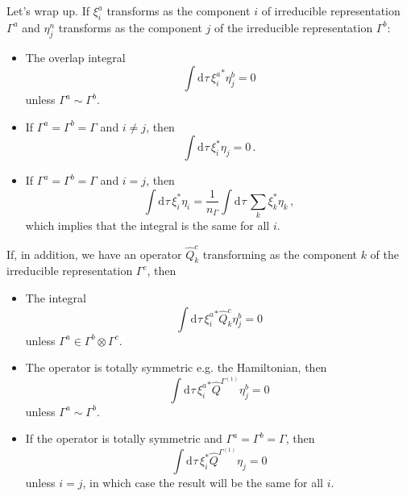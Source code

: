 \documentclass{article}
\theoremstyle{plain}\theoremheaderfont{\normalfont\itshape}\theorembodyfont{\rmfamily}\theoremseparator{.}\newtheorem*{rem}{Remark}\newtheorem*{ex}{Example}\newtheorem*{proof}{Proof}\newtheorem*{altp}{Alternative proof}
\theoremstyle{plain}\theoremheaderfont{\normalfont\bfseries}\theorembodyfont{\rmfamily}\theoremseparator{.}\newtheorem{thm}{Theorem}[section]\newtheorem{lem}[thm]{Lemma}\newtheorem{prop}[thm]{Proposition}\newtheorem*{cor}{Corollary}\newtheorem{defn}[thm]{Definition}\newtheorem{clm}[thm]{Claim}\newtheorem{clminproof}{Claim}\newtheorem*{law}{Law}\newtheorem{pos}[thm]{Postulate}
\theoremstyle{break}\theoremheaderfont{\normalfont\itshape}\theorembodyfont{\rmfamily}\theoremseparator{.\medskip}\newtheorem*{proofskip}{Proof}\newtheorem*{exs}{Examples}\newtheorem*{rems}{Remarks}
\theoremstyle{break}\theoremheaderfont{\normalfont\bfseries}\theorembodyfont{\rmfamily}\theoremseparator{.\medskip}\newtheorem{lemskip}[thm]{Lemma}\newtheorem{defnskip}[thm]{Definition}\newtheorem{propskip}[thm]{Proposition}\newtheorem{thmskip}[thm]{Theorem}
\numberwithin{equation}{section}
\newcommand{\dd}[2][]{\mathrm{d}^{#1} #2\,}
\begin{document}
    Let's wrap up. If \(\xi_i^a\) transforms as the component \(i\) of irreducible representation \(\Gamma^a\) and \(\eta_j^n\) transforms as the component \(j\) of the irreducible representation \(\Gamma^b\):
    \begin{itemize}[topsep=0pt]
        \item The overlap integral
        \begin{equation}
            \int\dd{\tau}{\xi_i^a}^*\eta_j^b=0
        \end{equation}
        unless \(\Gamma^a\sim\Gamma^b\).
        \item If \(\Gamma^a=\Gamma^b=\Gamma\) and \(i\ne j\), then
        \begin{equation}
            \int\dd{\tau}\xi_i^*\eta_j=0\,.
        \end{equation}
        \item If \(\Gamma^a=\Gamma^b=\Gamma\) and \(i=j\), then
        \begin{equation}
            \int\dd{\tau}\xi_i^*\eta_i=\frac{1}{n_\Gamma}\int\dd{\tau}\sum_k \xi_k^*\eta_k\,,
        \end{equation}
        which implies that the integral is the same for all \(i\).
    \end{itemize}
    If, in addition, we have an operator \(\hat{Q}_k^c\) transforming as the component \(k\) of the irreducible representation \(\Gamma^c\), then
    \begin{itemize}[topsep=0pt]
        \item The integral
        \begin{equation}
            \int\dd{\tau}{\xi_i^a}^*\hat{Q}_k^c\eta_j^b=0
        \end{equation}
        unless \(\Gamma^a\in\Gamma^b\otimes\Gamma^c\).
        \item The operator is totally symmetric e.g. the Hamiltonian, then
        \begin{equation}
            \int\dd{\tau}{\xi_i^a}^*\hat{Q}^{\Gamma^{(1)}}\eta_j^b=0
        \end{equation}
        unless \(\Gamma^a\sim\Gamma^b\).
        \item If the operator is totally symmetric and \(\Gamma^a=\Gamma^b=\Gamma\), then
        \begin{equation}
            \int\dd{\tau}\xi_i^*\hat{Q}^{\Gamma^{(1)}}\eta_j=0
        \end{equation}
        unless \(i=j\), in which case the result will be the same for all \(i\).
    \end{itemize}
\end{document}
